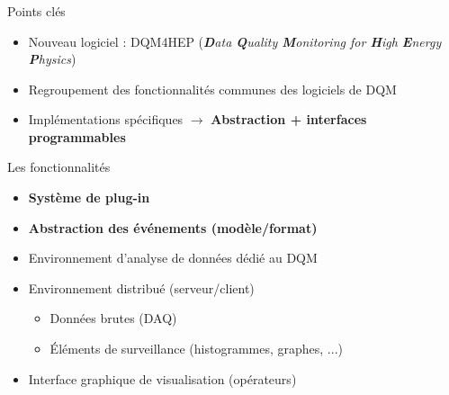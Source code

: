 \documentclass[8pt]{beamer}
\begin{document}
    \begin{frame}
    \frametitle{\secname}
    \framesubtitle{\subsecname}
      \begin{block}{Points clés}
        \begin{itemize}
          \item Nouveau logiciel : DQM4HEP (\textit{\textbf{D}ata \textbf{Q}uality \textbf{M}onitoring for \textbf{H}igh \textbf{E}nergy \textbf{P}hysics})
          \item Regroupement des fonctionnalités communes des logiciels de DQM
          \item Implémentations spécifiques $\rightarrow$ \textbf{Abstraction + interfaces programmables}
        \end{itemize}
      \end{block}
      \begin{block}{Les fonctionnalités}
        \begin{itemize}
          \item \textbf{Système de plug-in}
          \item \textbf{Abstraction des événements (modèle/format)}
          \item Environnement d'analyse de données dédié au DQM
          \item Environnement distribué (serveur/client)
          \begin{itemize}
            \item Données brutes (DAQ)
            \item Éléments de surveillance (histogrammes, graphes, ...)
          \end{itemize}
          \item Interface graphique de visualisation (opérateurs)
        \end{itemize}
      \end{block}
    \end{frame}
\end{document}
